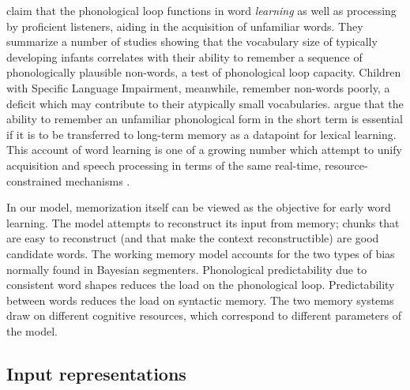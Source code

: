 \documentclass[11pt,letterpaper]{article}
\begin{document}

 claim that the phonological loop functions in
word \textit{learning} as well as processing by proficient listeners,
aiding in the acquisition of unfamiliar words. They summarize a number
of studies showing that the vocabulary size of typically developing
infants correlates with their ability to remember a sequence of
phonologically plausible non-words, a test of phonological loop
capacity. Children with Specific Language Impairment, meanwhile,
remember non-words poorly, a deficit which may contribute to their
atypically small vocabularies.  argue that the
ability to remember an unfamiliar phonological form in the short term
is essential if it is to be transferred to long-term memory as a
datapoint for lexical learning. This account of word learning is one
of a growing number which attempt to unify acquisition and speech
processing in terms of the same real-time, resource-constrained
mechanisms \cite{Apfelbaum16}.

In our model, memorization itself can be viewed as the objective for
early word learning. The model attempts to reconstruct its input from
memory; chunks that are easy to reconstruct (and that make the context
reconstructible) are good candidate words. The working memory model
accounts for the two types of bias normally found in Bayesian
segmenters. Phonological predictability due to consistent word shapes
\cite{Boerschinger14,Johnson09} reduces the load on the phonological
loop.  Predictability between words reduces the load on syntactic
memory. The two memory systems draw on different cognitive resources,
which correspond to different parameters of the model.

\subsection{Input representations}
\label{sub-representations}
\end{document}
